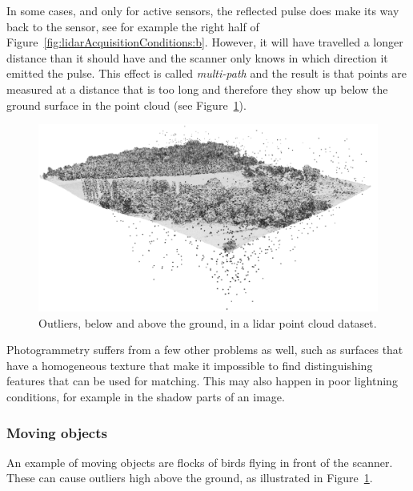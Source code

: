 In some cases, and only for active sensors, the reflected pulse does make its way back to the sensor, see for example the right half of Figure~\ref{fig:lidarAcquisitionConditions:b}. 
However, it will have travelled a longer distance than it should have and the scanner only knows in which direction it emitted the pulse. 
This effect is called \emph{multi-path} and the result is that points are measured at a distance that is too long and therefore they show up below the ground surface in the point cloud (see Figure~\ref{fig:outliers}).  
\begin{figure}
	\centering
	\includegraphics[width=\textwidth]{figs/outliers.png}
	\caption{Outliers, below and above the ground, in a lidar point cloud dataset.}%
\label{fig:outliers}
\end{figure}

Photogrammetry suffers from a few other problems as well, such as surfaces that have a homogeneous texture that make it impossible to find distinguishing features that can be used for matching. 
This may also happen in poor lightning conditions, for example in the shadow parts of an image.

\subsubsection{Moving objects}
An example of moving objects are flocks of birds flying in front of the scanner. These can cause outliers high above the ground, as illustrated in Figure~\ref{fig:outliers}.


